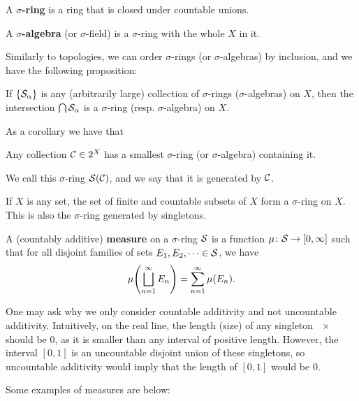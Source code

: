 \begin{definition}
    A \textbf{$\sigma$-ring} is a ring that is closed under countable unions.

    A \textbf{$\sigma$-algebra} (or $\sigma$-field) is a $\sigma$-ring with the whole $X$ in it.
\end{definition}

Similarly to topologies, we can order $\sigma$-rings (or $\sigma$-algebras) by inclusion, and we have the following proposition:

\begin{proposition}
    If $\qty{\mathcal S_\alpha}$ is any (arbitrarily large) collection of $\sigma$-rings ($\sigma$-algebras) on $X$, then the intersection $\bigcap \mathcal S_\alpha$ is a $\sigma$-ring (resp. $\sigma$-algebra) on $X$. 
\end{proposition}

As a corollary we have that 

\begin{corollary}
    Any collection $\mathcal C \in 2^X$ has a smallest $\sigma$-ring (or $\sigma$-algebra) containing it. 

    We call this $\sigma$-ring $\mathcal S(\mathcal C)$, and we say that it is generated by $\mathcal C$.
\end{corollary}

\begin{example}
    If $X$ is any set, the set of finite and countable subsets of $X$ form a $\sigma$-ring on $X$. This is also the $\sigma$-ring generated by singletons.
\end{example}

\begin{definition}
    A (countably additive) \textbf{measure} on a $\sigma$-ring $\mathcal S$ is a function $\mu \colon \mathcal S \to [0, \infty]$ such that for all disjoint families of sets $E_1, E_2, \dots \in \mathcal S$, we have \[\mu\qty(\bigsqcup_{n = 1}^\infty E_n) = \sum_{n = 1}^\infty \mu(E_n).\]
\end{definition}

One may ask why we only consider countable additivity and not uncountable additivity. Intuitively, on the real line, the length (size) of any singleton $\qty{x}$ should be $0$, as it is smaller than any interval of positive length. However, the interval $[0, 1]$ is an uncountable disjoint union of these singletons, so uncountable additivity would imply that the length of $[0, 1]$ would be $0$.

Some examples of measures are below:


